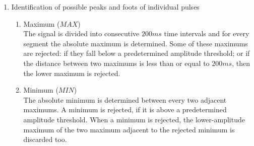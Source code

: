 \begin{enumerate}
  \item Identification of possible peaks and foots of individual pulses
  \begin{enumerate}
    \item Maximum ($MAX$)\\
          The signal is divided into consecutive $200 ms$ time intervals and
          for every segment the absolute maximum is determined. Some of these
          maximums are rejected: if they fall below a predetermined amplitude
          threshold; or if the distance between two maximums is less than or
          equal to $200 ms$, then the lower maximum is rejected.
    \item Minimum ($MIN$)\\
          The absolute minimum is determined between every two adjacent
          maximums. A minimum is rejected, if it is above a predetermined
          amplitude threshold. When a minimum is rejected, the lower-amplitude
          maximum of the two maximum adjacent to the rejected minimum is
          discarded too.
  \end{enumerate}


\end{enumerate}
